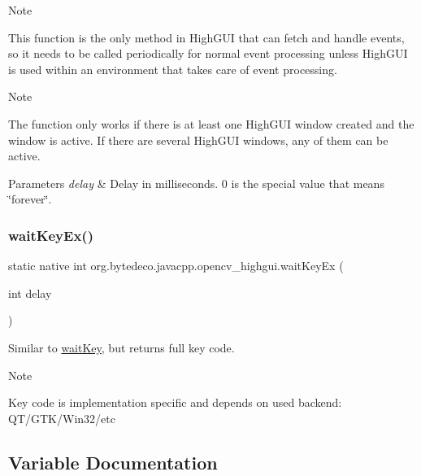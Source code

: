 \begin{DoxyNote}{Note}

\end{DoxyNote}
This function is the only method in High\+G\+UI that can fetch and handle events, so it needs to be called periodically for normal event processing unless High\+G\+UI is used within an environment that takes care of event processing. 

\begin{DoxyNote}{Note}

\end{DoxyNote}
The function only works if there is at least one High\+G\+UI window created and the window is active. If there are several High\+G\+UI windows, any of them can be active. 


\begin{DoxyParams}{Parameters}
{\em delay} & Delay in milliseconds. 0 is the special value that means \char`\"{}forever\char`\"{}. \\
\hline
\end{DoxyParams}
\mbox{\label{group__highgui_ga6a23d9d2816fcc0c96c3445b5969f5ac}} 
\subsubsection{\texorpdfstring{wait\+Key\+Ex()}{waitKeyEx()}}
{\footnotesize\ttfamily static native int org.\+bytedeco.\+javacpp.\+opencv\+\_\+highgui.\+wait\+Key\+Ex (\begin{DoxyParamCaption}\item[{int}]{delay }\end{DoxyParamCaption})\hspace{0.3cm}{\ttfamily [static]}}



Similar to \hyperlink{group__highgui_gaf924607bac022bb3603e459e3f2f3239}{wait\+Key}, but returns full key code. 

\begin{DoxyNote}{Note}

\end{DoxyNote}
Key code is implementation specific and depends on used backend\+: Q\+T/\+G\+T\+K/\+Win32/etc 

\subsection{Variable Documentation}
\mbox{\label{group__highgui_gac433101d8b17471ae4cc5161be63c257}} 
